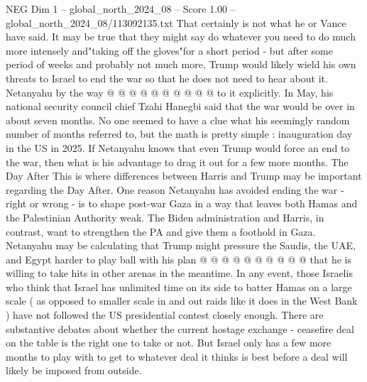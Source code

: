 \begin{textsample}{NEG Dim 1 – global\_north\_2024\_08 – Score 1.00 – global\_north\_2024\_08/113092135.txt}
That certainly is not what he or Vance have said.
It may be true that they might say do whatever you need to do much more intensely and"taking off the gloves"for a short period - but after some period of weeks and probably not much more, Trump would likely wield his own threats to Israel to end the war so that he does not need to hear about it.
Netanyahu by the way @ @ @ @ @ @ @ @ @ @ to it explicitly.
In May, his national security council chief Tzahi Hanegbi said that the war would be over in about seven months.
No one seemed to have a clue what his seemingly random number of months referred to, but the math is pretty simple : inauguration day in the US in 2025.
If Netanyahu knows that even Trump would force an end to the war, then what is his advantage to drag it out for a few more months.
The Day After This is where differences between Harris and Trump may be important regarding the Day After.
One reason Netanyahu has avoided ending the war - right or wrong - is to shape post-war Gaza in a way that leaves both Hamas and the Palestinian Authority weak.
The Biden administration and Harris, in contrast, want to strengthen the PA and give them a foothold in Gaza.
Netanyahu may be calculating that Trump might pressure the Saudis, the UAE, and Egypt harder to play ball with his plan @ @ @ @ @ @ @ @ @ @ that he is willing to take hits in other arenas in the meantime.
In any event, those Israelis who think that Israel has unlimited time on its side to batter Hamas on a large scale ( as opposed to smaller scale in and out raids like it does in the West Bank ) have not followed the US presidential contest closely enough.
There are substantive debates about whether the current hostage exchange - ceasefire deal on the table is the right one to take or not.
But Israel only has a few more months to play with to get to whatever deal it thinks is best before a deal will likely be imposed from outside.

\end{textsample}
